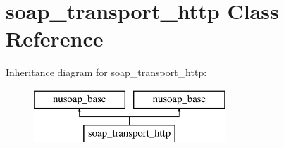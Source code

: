 \hypertarget{classsoap__transport__http}{}\section{soap\+\_\+transport\+\_\+http Class Reference}
\label{classsoap__transport__http}
Inheritance diagram for soap\+\_\+transport\+\_\+http\+:\begin{figure}[H]
\begin{center}
\leavevmode
\includegraphics[height=2.000000cm]{classsoap__transport__http}
\end{center}
\end{figure}
